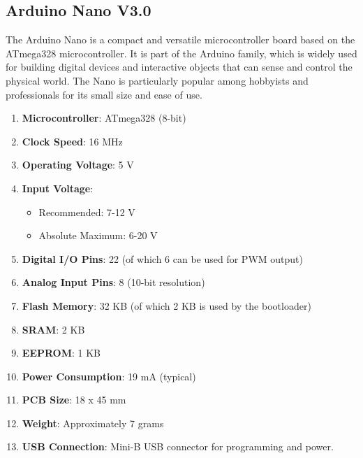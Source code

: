 \subsection{\fontsize{14}{16} Arduino Nano V3.0}
{
	\fontsize{12}{14}
	The Arduino Nano is a compact and versatile microcontroller board based on the ATmega328 microcontroller. It is part of the Arduino family, which is widely used for building digital devices and interactive objects that can sense and control the physical world. The Nano is particularly popular among hobbyists and professionals for its small size and ease of use.
	\begin{enumerate}
		\item \textbf{Microcontroller}: ATmega328 (8-bit)	
		
		\item \textbf{Clock Speed}: 16 MHz
		
		\item \textbf{Operating Voltage}: 5 V
		
		\item \textbf{Input Voltage}:
		\begin{itemize}
			\item Recommended: 7-12 V
			\item Absolute Maximum: 6-20 V
		\end{itemize}
		
		\item \textbf{Digital I/O Pins}: 22 (of which 6 can be used for PWM output)
		
		\item \textbf{Analog Input Pins}: 8 (10-bit resolution)
		
		\item \textbf{Flash Memory}: 32 KB (of which 2 KB is used by the bootloader)
		
		\item \textbf{SRAM}: 2 KB
		
		\item \textbf{EEPROM}: 1 KB
		
		\item \textbf{Power Consumption}: 19 mA (typical)
		
		\item \textbf{PCB Size}: 18 x 45 mm
		
		\item \textbf{Weight}: Approximately 7 grams
		
		\item \textbf{USB Connection}: Mini-B USB connector for programming and power.
	\end{enumerate}
	
}
